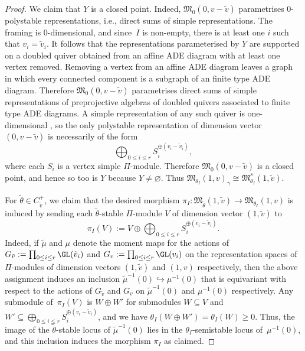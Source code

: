 \begin{proof}
 We claim that ${Y}$ is a closed point. Indeed, $\mathfrak{M}_0(0, v-\widetilde{v})$ parametrises
 0-polystable representations, i.e., direct sums of simple representations. The framing is 0-dimensional,
and since~$I$ is non-empty, there is at least one $i$ such that $v_i = \widetilde{v}_i$. It follows that the representations parameterised by ${Y}$
are supported on a doubled quiver obtained from an affine ADE diagram with at least one vertex removed. Removing a vertex from an affine ADE diagram leaves a graph in which every connected component is a subgraph of an finite type ADE diagram. Therefore $\mathfrak{M}_0(0, v-\widetilde{v})$ parametrises direct sums of simple representations of preprojective algebras of doubled quivers associated to finite type ADE diagrams. A simple representation of any such quiver is one-dimensional \cite[Lemma~2.2]{savage2011quiver}, so the only polystable representation of dimension vector $(0, v-\widetilde{v})$ is
necessarily of the form
\begin{equation}\label{eqn:directsumsimples}
\bigoplus_{0\leq i\leq r}S_i^{\oplus(v_i-\tilde{v}_i)},
\end{equation}
where each $S_i$ is a vertex simple $\Pi$-module. Therefore $\mathfrak{M}_0(0, v-\widetilde{v})$ is a closed point, and hence so too is ${Y}$ because ${Y}\neq \varnothing$. Thus $\mathfrak{M}_{\theta_I}(1,v)_{\gamma} \cong \mathfrak{M}^s_{\theta_I}(1,\widetilde{v})$.

For
 $\widetilde\theta\in C_{\widetilde v}^+$, we claim that the desired morphism $\pi_I\colon \mathfrak{M}_{\widetilde{\theta}}(1,\widetilde{v})\to \mathfrak{M}_{\theta_I}(1,v)$ is induced by sending each $\tilde{\theta}$-stable $\Pi$-module $V$ of dimension vector $(1,\tilde{v})$ to
 \[
 \pi_I(V):=V\oplus\bigoplus_{0\leq i\leq r}S_i^{\oplus(v_i-\tilde{v}_i)}.
 \]
 Indeed, if $\tilde{\mu}$ and $\mu$ denote the moment maps for the actions of $G_{\tilde{v}}:=\prod_{0\leq i\leq r}\GL(\tilde{v}_i)$ and $G_{v}:=\prod_{0\leq i\leq r}\GL(v_i)$ on the representation spaces of $\Pi$-modules of dimension vectors $(1,\tilde{v})$ and $(1,v)$ respectively, then the above assignment induces an inclusion $\tilde{\mu}^{-1}(0)\hookrightarrow \mu^{-1}(0)$ that is equivariant with respect to the actions of $G_{\tilde{v}}$ and $G_v$ on $\tilde{\mu}^{-1}(0)$ and $\mu^{-1}(0)$ respectively. Any submodule of~$\pi_I(V)$ is $W\oplus W'$ for submodules $W\subseteq V$ and $W'\subseteq \bigoplus_{0\leq i\leq r}S_i^{\oplus(v_i-\tilde{v}_i)}$, and we have $\theta_I(W\oplus W') = \theta_I(W)\geq 0$. Thus, the image of the $\tilde{\theta}$-stable locus of $\tilde{\mu}^{-1}(0)$ lies in the $\theta_I$-semistable locus of~$\mu^{-1}(0)$, and this inclusion induces the morphism $\pi_I$ as claimed.


\end{proof}
